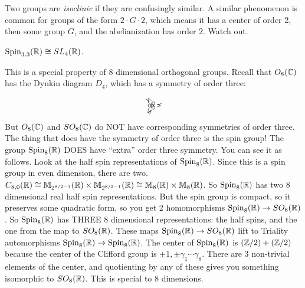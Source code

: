  Two groups are \emph{isoclinic} if they are confusingly similar. A similar
 phenomenon is common for groups of the form $2\cdot G\cdot 2$, which means it has a
 center of order 2, then some group $G$, and the abelianization has order $2$. Watch
 out.

 \begin{exercise}
   $\operatorname{Spin}_{3,3}(\mathbb{R})\cong SL_4(\mathbb{R})$.
 \end{exercise}

  This is a special property of 8 dimensional orthogonal groups.
 Recall that $O_8(\mathbb{C})$ has the Dynkin diagram $D_4$, which has a symmetry of order
 three:

    \[\begin{xy}
     (0,0) *\cir<2pt>{};
     a(60)="1" *\cir<2pt>{} **@{-},
     a(180)="2" *\cir<2pt>{} **@{-},
     a(-60)="3" *\cir<2pt>{} **@{-},
     \ar@/_2ex/ "1" *+{\ };"2" *+{\ }
     \ar@/_2ex/ "2" *+{\ };"3" *+{\ }
     \ar@/_2ex/ "3" *+{\ };"1" *+{\ }
   \end{xy}\]

 But $O_8(\mathbb{C})$ and $SO_8(\mathbb{C})$ do NOT have corresponding symmetries of order three.
 The thing that does have the symmetry of order three is the spin group! The group
 $\operatorname{Spin}_8(\mathbb{R})$ DOES have ``extra'' order three symmetry. You can see it as follows.
 Look at the half spin representations of $\operatorname{Spin}_8(\mathbb{R})$. Since this is a spin group
 in even dimension, there are two. $C_{8,0}(\mathbb{R})\cong \mathbb{M}_{2^{8/2 -1}}(\mathbb{R})\times \mathbb{M}_{2^{8/2
 -1}}(\mathbb{R}) \cong \mathbb{M}_8(\mathbb{R})\times \mathbb{M}_8(\mathbb{R})$. So $\operatorname{Spin}_8(\mathbb{R})$ has two 8 dimensional
 real half spin representations. But the spin group is compact, so it preserves some
 quadratic form, so you get 2 homomorphisms $\operatorname{Spin}_8(\mathbb{R})\to SO_8(\mathbb{R})$. So
 $\operatorname{Spin}_8(\mathbb{R})$ has THREE 8 dimensional representations: the half spins, and the one
 from the map to $SO_8(\mathbb{R})$. These maps $\operatorname{Spin}_8(\mathbb{R})\to SO_8(\mathbb{R})$ lift to Triality automorphisms $\operatorname{Spin}_8(\mathbb{R})\to \operatorname{Spin}_8(\mathbb{R})$.  The center of
 $\operatorname{Spin}_8(\mathbb{R})$ is $(\mathbb{Z}/2)+ (\mathbb{Z}/2)$ because the center of the Clifford group is $\pm
 1, \pm \gamma_1\cdots\gamma_8$. There are 3 non-trivial elements of the center, and
 quotienting by any of these gives you something isomorphic to $SO_8(\mathbb{R})$. This is
 special to 8 dimensions.

